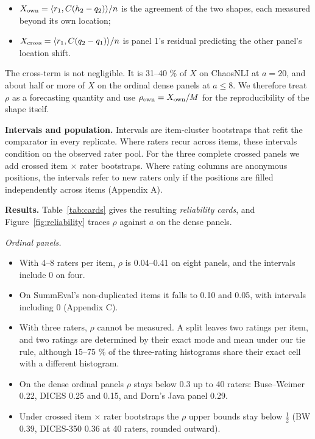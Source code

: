 \documentclass[10pt,twocolumn]{article}
\providecommand{\tightlist}{\setlength{\itemsep}{0pt}\setlength{\parskip}{0pt}}
\begin{document}
\begin{itemize}
\tightlist
\item
  \(X_{\rm own}=\langle r_1, C(h_2-q_2)\rangle/n\) is the agreement of the two shapes, each measured beyond its own location;
\item
  \(X_{\rm cross}=\langle r_1, C(q_2-q_1)\rangle/n\) is panel 1's residual predicting the other panel's location shift.
\end{itemize}

The cross-term is not negligible. It is 31--40 \% of \(X\) on ChaosNLI at \(a=20\), and about half or more of \(X\) on the ordinal dense panels at \(a\le 8\). We therefore treat \(\rho\) as a forecasting quantity and use \(\rho_{\rm own}=X_{\rm own}/M\) for the reproducibility of the shape itself.

\textbf{Intervals and population.} Intervals are item-cluster bootstraps that refit the comparator in every replicate. Where raters recur across items, these intervals condition on the observed rater pool. For the three complete crossed panels we add crossed item $\times$ rater bootstraps. Where rating columns are anonymous positions, the intervals refer to new raters only if the positions are filled independently across items (Appendix A).

\textbf{Results.} Table~\ref{tab:cards} gives the resulting \emph{reliability cards}, and Figure~\ref{fig:reliability} traces \(\rho\) against \(a\) on the dense panels.

\emph{Ordinal panels.}

\begin{itemize}
\tightlist
\item
  With 4--8 raters per item, $\rho$ is 0.04--0.41 on eight panels, and the intervals include 0 on four.
\item
  On SummEval's non-duplicated items it falls to 0.10 and 0.05, with intervals including 0 (Appendix C).
\item
  With three raters, $\rho$ cannot be measured. A split leaves two ratings per item, and two ratings are determined by their exact mode and mean under our tie rule, although 15--75 \% of the three-rating histograms share their exact cell with a different histogram.
\item
  On the dense ordinal panels $\rho$ stays below 0.3 up to 40 raters: Buse--Weimer 0.22, DICES 0.25 and 0.15, and Dorn's Java panel 0.29.
\item
  Under crossed item $\times$ rater bootstraps the $\rho$ upper bounds stay below $\tfrac12$ (BW 0.39, DICES-350 0.36 at 40 raters, rounded outward).
\end{itemize}
\end{document}
